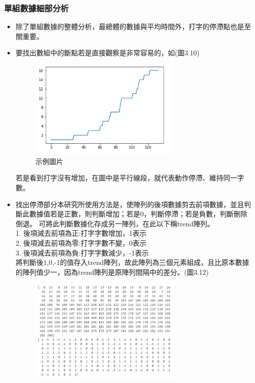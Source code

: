 \subsubsection{單組數據細部分析}
\begin{itemize}
	\item 除了單組數據的整體分析，最總體的數據與平均時間外，打字的停滯點也是至關重要。
	\item 要找出數組中的斷點若是直接觀察是非常容易的，如(圖3.10)
		\begin{figure}[H] 
		\centering 
		\includegraphics[width=0.7\textwidth]{3_10.png} 
		\caption{示例圖片} 
		\label{Fig.3.11} 
	\end{figure}
	若是看到打字沒有增加，在圖中是平行線段，就代表動作停滯、維持同一字數。
	\item 找出停滯部分本研究所使用方法是，使陣列的後項數據剪去前項數據，並且判斷此數據值若是正數，則判斷增加；若是0，判斷停滯；若是負數，判斷刪除倒退。
	可將此判斷數據化存成另一陣列，在此以下稱trend陣列。\\
	1. 後項減去前項為正:打字字數增加，1表示\\
	2. 後項減去前項為零:打字字數不變，0表示\\
	3. 後項減去前項為負:打字字數減少，-1表示\\
	將判斷後1,0,-1的值存入trend陣列，故此陣列為三個元素組成，且比原本數據的陣列值少一，因為trend陣列是原陣列間隔中的差分。(圖3.12)
		\begin{figure}[H] 
		\centering 
		\includegraphics[width=0.7\textwidth]{3_11.png} 

\end{figure}
\end{itemize}
